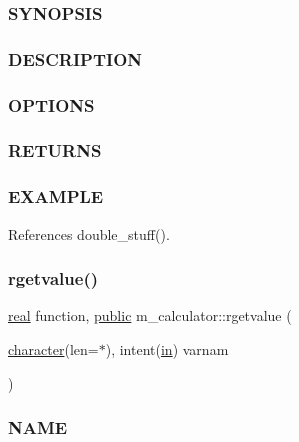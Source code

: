 \subsubsection*{S\+Y\+N\+O\+P\+S\+IS}

\subsubsection*{D\+E\+S\+C\+R\+I\+P\+T\+I\+ON}

\subsubsection*{O\+P\+T\+I\+O\+NS}

\subsubsection*{R\+E\+T\+U\+R\+NS}

\subsubsection*{E\+X\+A\+M\+P\+LE}

References double\+\_\+stuff().

\mbox{\label{namespacem__calculator_af8d4bcc1789a047303ac7061c2a504e8}} 
\subsubsection{\texorpdfstring{rgetvalue()}{rgetvalue()}}
{\footnotesize\ttfamily \hyperlink{read__watch_83_8txt_abdb62bde002f38ef75f810d3a905a823}{real} function, \hyperlink{M__stopwatch_83_8txt_a2f74811300c361e53b430611a7d1769f}{public} m\+\_\+calculator\+::rgetvalue (\begin{DoxyParamCaption}\item[{\hyperlink{option__stopwatch_83_8txt_abd4b21fbbd175834027b5224bfe97e66}{character}(len=$\ast$), intent(\hyperlink{M__journal_83_8txt_afce72651d1eed785a2132bee863b2f38}{in})}]{varnam }\end{DoxyParamCaption})}



\subsubsection*{N\+A\+ME}

